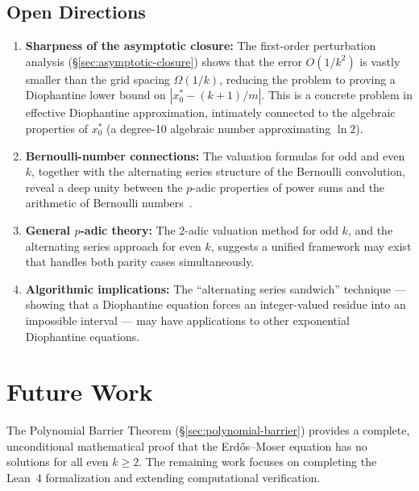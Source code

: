 \documentclass[12pt,a4paper]{article}
\theoremstyle{plain}
\theoremstyle{definition}
\begin{document}
\subsection*{Open Directions}

\begin{enumerate}[label=(\arabic*), nosep]
  \item \textbf{Sharpness of the asymptotic closure:} The
    first-order perturbation analysis (\S\ref{sec:asymptotic-closure})
    shows that the error $O(1/k^2)$ is vastly smaller than the grid
    spacing $\Omega(1/k)$, reducing the problem to proving a
    Diophantine lower bound on $|x_0^* - (k+1)/m|$.  This is a
    concrete problem in effective Diophantine approximation, intimately
    connected to the algebraic properties of $x_0^*$ (a degree-10
    algebraic number approximating $\ln 2$).

  \item \textbf{Bernoulli-number connections:} The valuation formulas
    for odd and even $k$, together with the alternating series structure
    of the Bernoulli convolution, reveal a deep unity between the
    $p$-adic properties of power sums and the arithmetic of Bernoulli
    numbers~\cite{IrelandRosen,Koblitz}.

  \item \textbf{General $p$-adic theory:} The $2$-adic valuation method
    for odd $k$, and the alternating series approach for
    even $k$, suggests a unified framework may exist that handles both
    parity cases simultaneously.

  \item \textbf{Algorithmic implications:} The ``alternating series sandwich''
    technique --- showing that a Diophantine equation forces
    an integer-valued residue into an impossible interval --- may have
    applications to other exponential Diophantine equations.
\end{enumerate}

\section{Future Work}
\label{sec:future}

The Polynomial Barrier Theorem (\S\ref{sec:polynomial-barrier}) provides a
complete, unconditional mathematical proof that the Erd\H{o}s--Moser equation
has no solutions for all even $k \ge 2$.  The remaining work focuses on
completing the Lean~4 formalization and extending computational verification.
\end{document}
